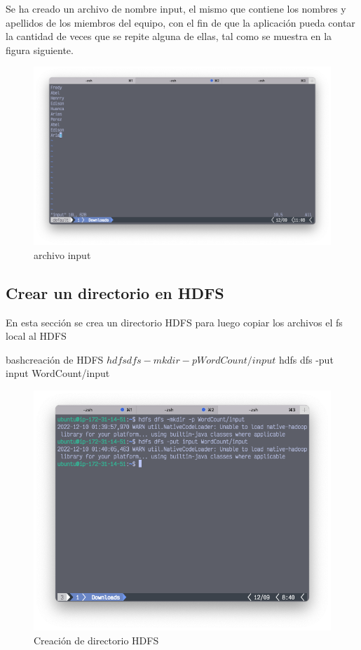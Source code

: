 Se ha creado un archivo de nombre input, el mismo que contiene los nombres y apellidos de los miembros del equipo, con el fin de que la aplicación pueda contar la cantidad de veces que se repite alguna de ellas, tal como se muestra en la figura siguiente.

\begin{figure}[h]
	\centering
	\includegraphics[scale=.35] {img/48-input}
	\caption{archivo input}
	\label{fig:48}	
\end{figure} 




\subsection{Crear un directorio en HDFS}

En esta sección se crea un directorio HDFS para luego copiar los archivos el fs local al HDFS
\begin{sourcecode}[]{bash}{creación de HDFS}
$ hdfs dfs -mkdir -p WordCount/input
$ hdfs dfs -put input WordCount/input
\end{sourcecode}


\begin{figure}[h]
	\centering
	\includegraphics[scale=.28] {img/49-hdfs-dfs-mkdir-p-wordcount-input}
	\caption{Creación de directorio HDFS}
	\label{fig:49}	
\end{figure} 


